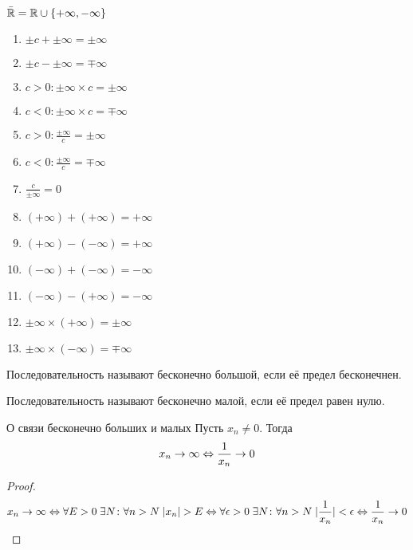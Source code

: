 \begin{Rem}
${\bar{\mathbb{R}}} = \mathbb{R} \cup \{+\infty, -\infty\}$
\begin{enumerate}
\item $\pm c+\pm\infty = \pm\infty$
\item $\pm c-\pm\infty = \mp\infty$
\item $c>0\colon \pm \infty \times c = \pm \infty$
\item $c<0\colon \pm \infty \times c = \mp \infty$
\item $c>0\colon \frac{\pm \infty}{c} = \pm \infty$
\item $c<0\colon \frac{\pm \infty}{c} = \mp \infty$
\item $\frac{c}{\pm \infty} = 0$
\item $(+\infty) + (+\infty) = +\infty$
\item $(+\infty) - (-\infty) = +\infty$
\item $(-\infty) + (-\infty) = -\infty$
\item $(-\infty) - (+\infty) = -\infty$
\item $\pm \infty \times (+ \infty) = \pm \infty$
\item $\pm \infty \times (- \infty) = \mp \infty$
\end{enumerate}
\end{Rem}

\begin{Def}
Последовательность называют бесконечно большой, если её предел бесконечнен.
\end{Def}
\begin{Def}
Последовательность называют бесконечно малой, если её предел равен нулю.
\end{Def}

\begin{theorem}{О связи бесконечно больших и малых}
Пусть $x_n \ne 0$. Тогда
$$x_n \rightarrow \infty \Leftrightarrow \frac1{x_n} \rightarrow 0$$
\end{theorem}
\begin{proof}
$$x_n \rightarrow \infty \Leftrightarrow \forall E > 0\; \exists N\colon \forall n > N\; |x_n| > E \Leftrightarrow \forall \epsilon > 0\; \exists N\colon \forall n > N\; |\frac1{x_n}| < \epsilon \Leftrightarrow 
\frac1{x_n} \rightarrow 0$$
\end{proof}

